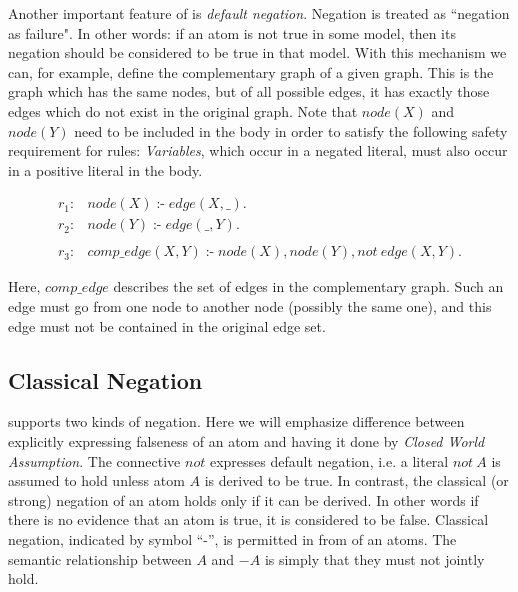 \documentclass[a4paper, titlepage]{article}
\DeclareMathOperator{\leftimpl}{:-}
\begin{document}
Another important feature of \dlvhex{} is \emph{default 
negation}. Negation is treated as ``negation as failure". 
In other words: if an atom is not true in some model, then 
its negation should be considered to be true in that model. 
With this mechanism we can, for example, define the 
complementary graph of a given graph. This is the graph 
which has the same nodes, but of all possible edges, it has 
exactly those edges which do not exist in the original 
graph. Note that $\mathit{node}(X)$ and $\mathit{node}(Y)$ 
need to be included in the body in order to satisfy the 
following safety requirement for rules: \emph{Variables}, 
which occur in a negated literal, must also occur in a 
positive literal in the body.
\begin{exmp}
\begin{align*}
r_1\colon& \mathit{node}(X) \leftimpl \mathit{edge}(X, \_).
\\
r_2\colon& \mathit{node}(Y) \leftimpl \mathit{edge}(\_, Y). 
\\
\\
r_3\colon& \mathit{comp\_edge}(X, Y) \leftimpl 
\mathit{node}(X), \mathit{node}(Y), \mathit{ not } \ \mathit{ 
edge }(X, Y). 
\end{align*}
\end{exmp}
Here, $\mathit{comp\_edge}$ describes the set of edges in 
the complementary graph. Such an edge must go from one node 
to another node (possibly the same one), and this edge must 
not be contained in the original edge set. 

\subsection{Classical Negation}
\dlvhex{} supports two kinds of negation. Here we will 
emphasize difference between explicitly expressing 
falseness of an atom and having it done by \emph{Closed 
World Assumption}. The connective $\mathit{not}$ expresses 
default negation, i.e. a literal $\mathit{not} \ A$ is assumed 
to hold unless atom $A$ is derived to be true. In contrast, 
the classical (or strong) negation of an atom holds only if 
it can be derived. In other words if there is no evidence 
that an atom is true, it is considered to be false. 
Classical negation, indicated by symbol ``-'', is 
permitted in from of an atoms. The semantic relationship 
between $A$ and $\mathit{-A}$ is simply that they must not jointly 
hold.
\end{document}
